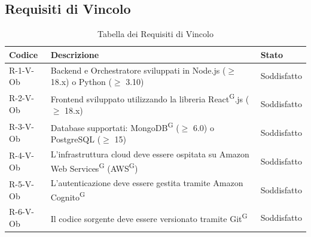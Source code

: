 \documentclass[a4paper, 11pt]{article}
\renewcommand{\arraystretch}{1.4}
\begin{document}
\subsection{Requisiti di Vincolo}
\renewcommand{\arraystretch}{1.5}
\begin{longtable}[c]{ >{\centering\arraybackslash}m{2.5cm} >{\centering\arraybackslash}m{8.3cm} >{\centering\arraybackslash}m{3.5cm} }
    \caption{Tabella dei Requisiti di Vincolo} \\
    \rowcolor{AccentDark}
    \color{white}\textbf{Codice} & \color{white}\textbf{Descrizione} & \color{white}\textbf{Stato} \\
    \endhead
    R-1-V-Ob & Backend e Orchestratore sviluppati in Node.js ($\geq$ 18.x) o Python ($\geq$ 3.10) & Soddisfatto \\
    R-2-V-Ob & Frontend sviluppato utilizzando la libreria React\textsuperscript{G}.js ($\geq$ 18.x) & Soddisfatto \\
    R-3-V-Ob & Database supportati: MongoDB\textsuperscript{G} ($\geq$ 6.0) o PostgreSQL ($\geq$ 15) & Soddisfatto \\
    R-4-V-Ob & L'infrastruttura cloud deve essere ospitata su Amazon Web Services\textsuperscript{G} (AWS\textsuperscript{G}) & Soddisfatto \\
    R-5-V-Ob & L'autenticazione deve essere gestita tramite Amazon Cognito\textsuperscript{G} & Soddisfatto \\
    R-6-V-Ob & Il codice sorgente deve essere versionato tramite Git\textsuperscript{G} & Soddisfatto
\end{longtable}
\end{document}

